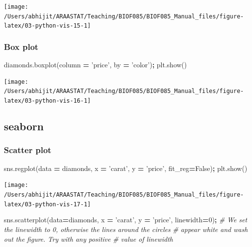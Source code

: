 \documentclass[
  letterpaper,
]{scrbook}
\newenvironment{Shaded}{\begin{snugshade}}{\end{snugshade}}
\newcommand{\CommentTok}[1]{\textcolor[rgb]{0.56,0.35,0.01}{\textit{#1}}}
\newcommand{\DecValTok}[1]{\textcolor[rgb]{0.00,0.00,0.81}{#1}}
\newcommand{\NormalTok}[1]{#1}
\newcommand{\OperatorTok}[1]{\textcolor[rgb]{0.81,0.36,0.00}{\textbf{#1}}}
\newcommand{\StringTok}[1]{\textcolor[rgb]{0.31,0.60,0.02}{#1}}
\newcommand{\VariableTok}[1]{\textcolor[rgb]{0.00,0.00,0.00}{#1}}
\begin{document}
\begin{center}\texttt{[image: /Users/abhijit/ARAASTAT/Teaching/BIOF085/BIOF085\_Manual\_files/figure-latex/03-python-vis-15-1]} \end{center}

\hypertarget{box-plot}{%
\subsubsection{Box plot}\label{box-plot}}

\begin{Shaded}
\begin{Highlighting}[]
\NormalTok{diamonds.boxplot(column }\OperatorTok{=} \StringTok{'price'}\NormalTok{, by }\OperatorTok{=} \StringTok{'color'}\NormalTok{)}\OperatorTok{;}
\NormalTok{plt.show()}
\end{Highlighting}
\end{Shaded}

\begin{center}\texttt{[image: /Users/abhijit/ARAASTAT/Teaching/BIOF085/BIOF085\_Manual\_files/figure-latex/03-python-vis-16-1]} \end{center}

\hypertarget{seaborn-1}{%
\subsection{seaborn}\label{seaborn-1}}

\hypertarget{scatter-plot-1}{%
\subsubsection{Scatter plot}\label{scatter-plot-1}}

\begin{Shaded}
\begin{Highlighting}[]
\NormalTok{sns.regplot(data }\OperatorTok{=}\NormalTok{ diamonds, x }\OperatorTok{=} \StringTok{'carat'}\NormalTok{, y }\OperatorTok{=} \StringTok{'price'}\NormalTok{, fit_reg}\OperatorTok{=}\VariableTok{False}\NormalTok{)}\OperatorTok{;}
\NormalTok{plt.show()}
\end{Highlighting}
\end{Shaded}

\begin{center}\texttt{[image: /Users/abhijit/ARAASTAT/Teaching/BIOF085/BIOF085\_Manual\_files/figure-latex/03-python-vis-17-1]} \end{center}

\begin{Shaded}
\begin{Highlighting}[]
\NormalTok{sns.scatterplot(data}\OperatorTok{=}\NormalTok{diamonds, x }\OperatorTok{=} \StringTok{'carat'}\NormalTok{, y }\OperatorTok{=} \StringTok{'price'}\NormalTok{, linewidth}\OperatorTok{=}\DecValTok{0}\NormalTok{)}\OperatorTok{;} 
\CommentTok{# We set the linewidth to 0, otherwise the lines around the circles}
\CommentTok{# appear white and wash out the figure. Try with any positive }
\CommentTok{# value of linewidth}
\end{Highlighting}
\end{Shaded}
\end{document}
